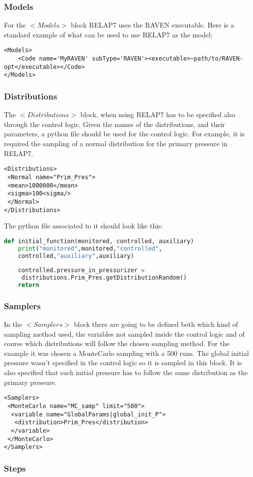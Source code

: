 \subsubsection{Models}
For the $<Models>$ block RELAP7 uses the RAVEN executable. Here is a standard example of what can be used to use RELAP7 as the model:
\begin{lstlisting}[style=XML]
<Models>
    <Code name='MyRAVEN' subType='RAVEN'><executable>~path/to/RAVEN-opt</executable></Code>
</Models>
\end{lstlisting}
\subsubsection{Distributions}
The $<Distributions>$ block, when using RELAP7 has to be specified also through the control logic.
Given the names of the distributions, and their parameters, a python file should be used for the control logic.
For example, it is required the sampling of a normal distribution for the primary pressure in RELAP7. 
\begin{lstlisting}[style=XML]
<Distributions>
 <Normal name="Prim_Pres">
 <mean>1000000</mean>
 <sigma>100<sigma/>
 </Normal>
</Distributions>
\end{lstlisting}
The python file associated to it should look like this:
\begin{lstlisting}[language=Python]
def initial_function(monitored, controlled, auxiliary)
    print("monitored",monitored,"controlled",
    controlled,"auxiliary",auxiliary)  
    
    controlled.pressure_in_pressurizer =
     distributions.Prim_Pres.getDistributionRandom()
    return
\end{lstlisting} 
\subsubsection{Samplers}
In the $<Samplers>$ block there are going to be defined both which kind of sampling method used, the variables not sampled inside the control logic and of course which distributions will follow the chosen sampling method.
For the example it was chosen a MonteCarlo sampling with a 500 runs. The global initial pressure wasn't specified in the control logic so it is sampled in this block. It is also specified that such initial pressure has to follow the same distribution as the primary pressure. 
\begin{lstlisting}[style=XML]
<Samplers>
 <MonteCarlo name="MC_samp" limit="500"> 
  <variable name="GlobalParams|global_init_P">
   <distribution>Prim_Pres</distribution>
  </variable>
 </MonteCarlo>
</Samplers>
\end{lstlisting}
\subsubsection{Steps}










